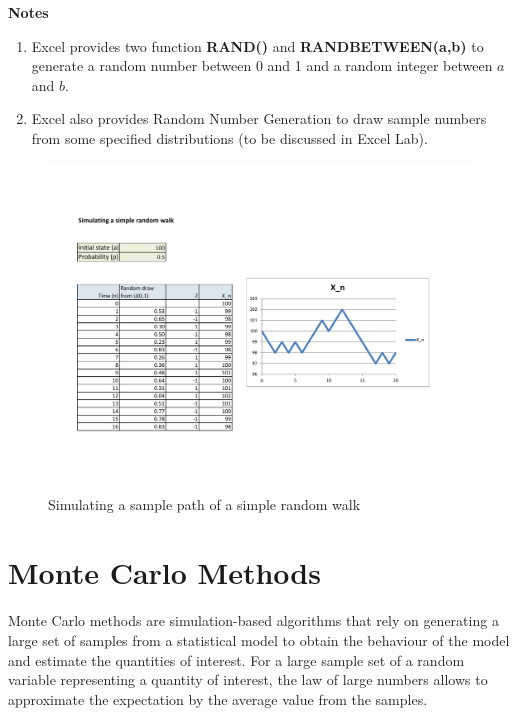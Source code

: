 \documentclass[landscape, 20pt]{extreport}
\theoremstyle{definition}
\theoremstyle{definition}
\theoremstyle{definition}
\theoremstyle{definition}
\theoremstyle{remark}
\begin{document}
\textbf{Notes}

\begin{enumerate}
\def\labelenumi{\arabic{enumi}.}
\item
  Excel provides two function \textbf{RAND()} and \textbf{RANDBETWEEN(a,b)} to
  generate a random number between 0 and 1 and a random integer
  between \(a\) and \(b\).
\item
  Excel also provides Random Number Generation to draw sample numbers
  from some specified distributions (to be discussed in Excel Lab).
\end{enumerate}

\begin{figure}
\hypertarget{fig:RW}{%
\centering
\includegraphics[width=8in,height=\textheight]{RW.pdf}
\caption{Simulating a sample path of a simple random walk}\label{fig:RW}
}
\end{figure}

\hypertarget{monte-carlo-methods}{%
\section{Monte Carlo Methods}\label{monte-carlo-methods}}

Monte Carlo methods are simulation-based algorithms that rely on
generating a large set of samples from a statistical model to obtain the
behaviour of the model and estimate the quantities of interest. For a
large sample set of a random variable representing a quantity of
interest, the law of large numbers allows to approximate the expectation
by the average value from the samples.
\end{document}
